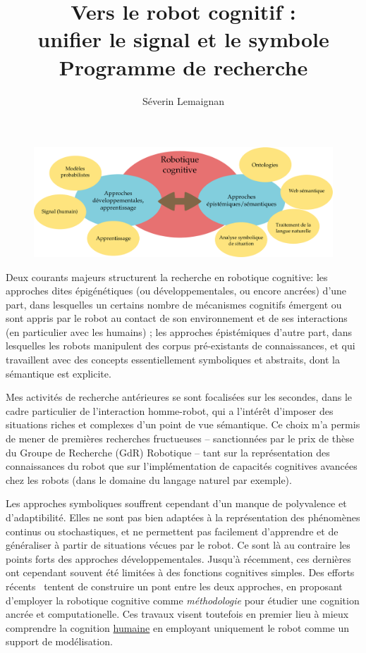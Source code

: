 \documentclass[a4paper]{article}
\title{Vers le robot cognitif :\\ unifier le signal et le symbole\\ 
    {\large Programme de recherche}}
\author{Séverin Lemaignan}
\date{}
\begin{document}
\maketitle

\begin{figure}
    \centering
    \includegraphics[width=1.0\linewidth]{place}
    \caption{}
    \label{place}
\end{figure}


Deux courants majeurs structurent la recherche en robotique cognitive: les
approches dites épigénétiques (ou développementales, ou encore ancrées) d'une
part, dans lesquelles un certains nombre de mécanismes cognitifs émergent ou
sont appris par le robot au contact de son environnement et de ses interactions
(en particulier avec les humains) ; les approches épistémiques d'autre part,
dans lesquelles les robots manipulent des corpus pré-existants de connaissances,
et qui travaillent avec des concepts essentiellement symboliques et abstraits,
dont la sémantique est explicite.

Mes activités de recherche antérieures se sont focalisées sur les secondes, dans
le cadre particulier de l'interaction homme-robot, qui a l'intérêt d'imposer des
situations riches et complexes d'un point de vue sémantique. Ce choix m'a permis
de mener de premières recherches fructueuses -- sanctionnées par le prix de
thèse du Groupe de Recherche (GdR) Robotique -- tant sur la représentation des
connaissances du robot que sur l'implémentation de capacités cognitives avancées
chez les robots (dans le domaine du langage naturel par exemple). 

Les approches symboliques souffrent cependant d'un manque de polyvalence et
d'adaptibilité. Elles ne sont pas bien adaptées à la représentation des
phénomènes continus ou stochastiques, et ne permettent pas facilement
d'apprendre et de généraliser à partir de situations vécues par le robot. Ce
sont là au contraire les points forts des approches développementales.  Jusqu'à
récemment, ces dernières ont cependant souvent été limitées à des fonctions
cognitives simples. Des efforts récents~\cite{morse2010epigenetic,
pezzulo2012computational} tentent de construire un pont entre les deux
approches, en proposant d'employer la robotique cognitive comme
\emph{méthodologie} pour étudier une cognition ancrée et computationelle. Ces
travaux visent toutefois en premier lieu à mieux comprendre la cognition
\underline{humaine} en employant uniquement le robot comme un support de
modélisation.
\end{document}
